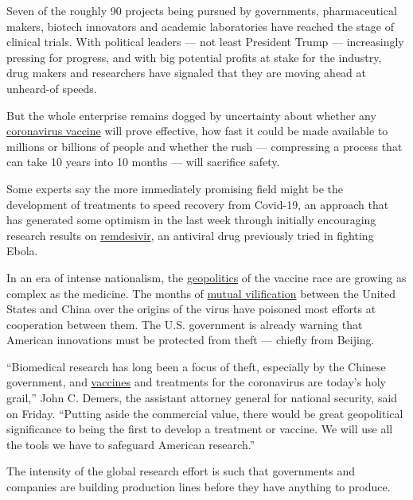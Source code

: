 Seven of the roughly 90 projects being pursued by governments,
pharmaceutical makers, biotech innovators and academic laboratories have
reached the stage of clinical trials. With political leaders --- not
least President Trump --- increasingly pressing for progress, and with
big potential profits at stake for the industry, drug makers and
researchers have signaled that they are moving ahead at unheard-of
speeds.

But the whole enterprise remains dogged by uncertainty about whether any
\href{https://www.nytimes3xbfgragh.onion/2020/05/20/health/coronavirus-vaccines.html}{coronavirus
vaccine} will prove effective, how fast it could be made available to
millions or billions of people and whether the rush --- compressing a
process that can take 10 years into 10 months --- will sacrifice safety.

Some experts say the more immediately promising field might be the
development of treatments to speed recovery from Covid-19, an approach
that has generated some optimism in the last week through initially
encouraging research results on
\href{https://www.nytimes3xbfgragh.onion/2020/04/29/health/gilead-remdesivir-coronavirus.html}{remdesivir},
an antiviral drug previously tried in fighting Ebola.

In an era of intense nationalism, the
\href{https://www.nytimes3xbfgragh.onion/2020/03/19/us/politics/coronavirus-vaccine-competition.html}{geopolitics}
of the vaccine race are growing as complex as the medicine. The months
of
\href{https://www.nytimes3xbfgragh.onion/2020/05/01/us/politics/coronavirus-china-trump.html}{mutual
vilification} between the United States and China over the origins of
the virus have poisoned most efforts at cooperation between them. The
U.S. government is already warning that American innovations must be
protected from theft --- chiefly from Beijing.

``Biomedical research has long been a focus of theft, especially by the
Chinese government, and
\href{https://www.nytimes3xbfgragh.onion/2020/05/15/us/politics/coronavirus-vaccine-timeline.html}{vaccines}
and treatments for the coronavirus are today's holy grail,'' John C.
Demers, the assistant attorney general for national security, said on
Friday. ``Putting aside the commercial value, there would be great
geopolitical significance to being the first to develop a treatment or
vaccine. We will use all the tools we have to safeguard American
research.''

The intensity of the global research effort is such that governments and
companies are building production lines before they have anything to
produce.

